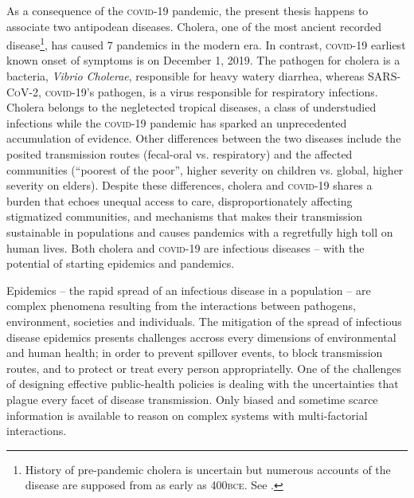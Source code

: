   As a consequence of the \textsc{covid}-19 pandemic, the present thesis happens to associate two antipodean diseases. Cholera, one of the most ancient recorded disease\footnote[][]{History of pre-pandemic cholera is uncertain but numerous accounts of the disease are supposed from as early as 400\textsc{bce}. See .}, has caused 7 pandemics in the modern era. In contrast, \textsc{covid}-19 earliest known onset of symptoms is on December 1, 2019. The pathogen for cholera is a bacteria, \textit{Vibrio Cholerae}, responsible for heavy watery diarrhea, whereas \textsc{SARS-CoV-2}, \textsc{covid}-19’s pathogen, is a virus responsible for respiratory infections. Cholera belongs to the negletected tropical diseases, a class of understudied infections while the \textsc{covid}-19 pandemic has sparked an unprecedented accumulation of evidence. 
Other differences between the two diseases include the posited transmission routes (fecal-oral vs. respiratory) and the affected communities (``poorest of the poor”, higher severity on children vs. global, higher severity on elders). Despite these differences, cholera and \textsc{covid}-19 shares a burden that echoes unequal access to care, disproportionately affecting stigmatized communities, and  mechanisms that makes their transmission sustainable in populations and causes pandemics with a regretfully high toll on human lives. Both cholera and \textsc{covid}-19 are infectious diseases -- with the potential of starting epidemics and pandemics.%

 
Epidemics -- the rapid spread of an infectious disease in a population -- are  complex phenomena resulting from the interactions between pathogens, environment, societies and individuals\cite{Rinaldo:RiverNetworksEcological:2020a, Buckee:ThinkingClearlySocial:2021, Heesterbeek:ModelingInfectiousDisease:2015}. The mitigation of the spread of infectious disease epidemics presents challenges accross every dimensions of environmental and human health; in order to prevent spillover events, to block transmission routes, and to protect or treat every person appropriatelly. %
 One of the challenges of designing effective public-health policies is dealing with the uncertainties that plague every facet of disease transmission. Only biased and sometime scarce information is available to reason on complex systems with multi-factorial interactions. 
 

